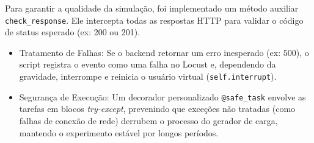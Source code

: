 Para garantir a qualidade da simulação, foi implementado um método auxiliar \texttt{check\_response}. Ele intercepta todas as respostas HTTP para validar o código de status esperado (ex: 200 ou 201).
\begin{itemize}
    \item Tratamento de Falhas: Se o backend retornar um erro inesperado (ex: 500), o script registra o evento como uma falha no Locust e, dependendo da gravidade, interrompe e reinicia o usuário virtual (\texttt{self.interrupt}).
    \item Segurança de Execução: Um decorador personalizado \texttt{@safe\_task} envolve as tarefas em blocos \textit{try-except}, prevenindo que exceções não tratadas (como falhas de conexão de rede) derrubem o processo do gerador de carga, mantendo o experimento estável por longos períodos.
\end{itemize}


